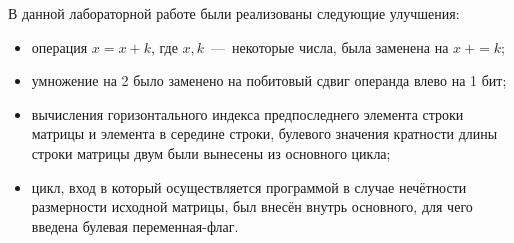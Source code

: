 В данной лабораторной работе были реализованы следующие улучшения:
\begin{itemize}
	\item операция $x = x + k$, где $x,k$~---~некоторые числа, была заменена на $x\ += k$;
	\item умножение на 2 было заменено на побитовый сдвиг операнда влево на 1 бит;
	\item вычисления горизонтального индекса предпоследнего элемента строки матрицы и элемента в середине строки, булевого значения кратности длины строки матрицы двум были вынесены из основного цикла;
	\item цикл, вход в который осуществляется программой в случае нечётности размерности исходной матрицы, был внесён внутрь основного, для чего введена булевая переменная-флаг.
\end{itemize}

\newpage